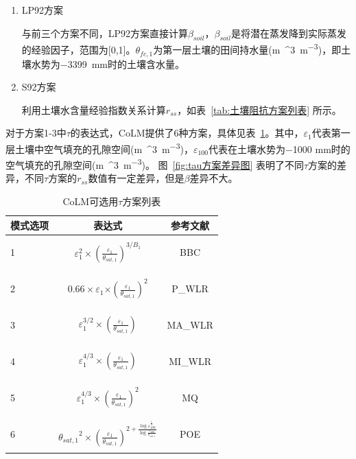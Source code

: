 \begin{enumerate}
\item
  LP92方案

与前三个方案不同，LP92方案直接计算\(\beta_{soil}\)，\(\beta_{soil}\)是将潜在蒸发降到实际蒸发的经验因子，范围为{[}0,1{]}。\(\theta_{fc,1}\)为第一层土壤的田间持水量(\unit{m{^3}.m^{-3}})，即土壤水势为\qty{-3399}{mm}时的土壤含水量。

\item
  S92方案

利用土壤水含量经验指数关系计算\(r_{ss}\)，如表~\ref{tab:土壤阻抗方案列表} 所示。
%
\end{enumerate}

对于方案1-3中\(\tau\)的表达式，CoLM提供了6种方案，具体见表~\ref{tab:tau方案列表}。其中，\(\varepsilon_{1}\)代表第一层土壤中空气填充的孔隙空间(\unit{m{^3}.m^{-3}})，\(\varepsilon_{100}\)代表在土壤水势为\num{-1000} mm时的空气填充的孔隙空间(\unit{m{^3}.m^{-3}})。
图~\ref{fig:tau方案差异图} 表明了不同\(\tau\)方案的差异，不同\(\tau\)方案的\(r_{ss}\)数值有一定差异，但是$\beta$差异不大。

{
\begin{table}[htbp]
\centering
\caption{CoLM可选用$\tau$方案列表}
\label{tab:tau方案列表}
\begin{tabular}{lcc}
\toprule
模式选项 & 表达式 & 参考文献 \\ 
\midrule
1 &
\(\varepsilon_{1}^{2} \times {(\frac{\varepsilon_{1}}{\theta_{sat,1}})}^{3/B_{1}}\)
& \cite{BBC1999}

BBC \\
2 &
\(0.66 \times \varepsilon_{1}{\times (\frac{\varepsilon_{1}}{\theta_{sat,1}})}^{2}\)
& \cite{moldrup2000}

P\_WLR \\
3 &
\(\varepsilon_{1}^{3/2} \times (\frac{\varepsilon_{1}}{\theta_{sat,1}})\)
& \cite{moldrup2000}

MA\_WLR \\
4 &
\(\varepsilon_{1}^{4/3} \times (\frac{\varepsilon_{1}}{\theta_{sat,1}})\)
& \cite{moldrup2000}

MI\_WLR \\
5 &
\(\varepsilon_{1}^{4/3} \times {(\frac{\varepsilon_{1}}{\theta_{sat,1}})}^{2}\)
& \cite{millington_permeability_1961}

MQ \\
6 &
\({\theta_{sat,1}}^{2} \times {(\frac{\varepsilon_{1}}{\theta_{sat,1}})}^{2 + \frac{\log\varepsilon_{100}^{\frac{1}{4}}}{\log\frac{\varepsilon_{100}}{\theta_{sat,1}}}}\)
& \cite{POE2004}

POE \\ \bottomrule    
\end{tabular}
\end{table}
}

